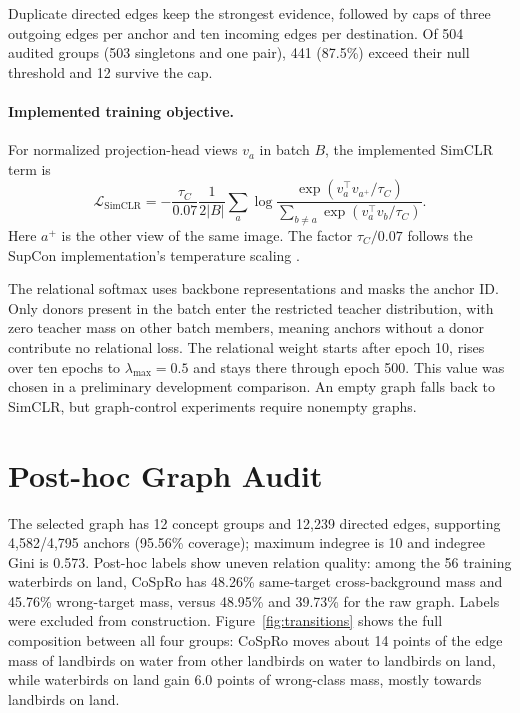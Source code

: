 \documentclass{article}
\begin{document}
Duplicate directed edges keep the strongest evidence, followed by caps of three outgoing edges per anchor and ten incoming edges per destination. Of 504 audited groups (503 singletons and one pair), 441 (87.5\%) exceed their null threshold and 12 survive the cap.

\paragraph{Implemented training objective.}
For normalized projection-head views $v_a$ in batch $B$, the implemented SimCLR term is
\begin{equation}
\mathcal{L}_{\mathrm{SimCLR}} = -\frac{\tau_C}{0.07} \frac{1}{2|B|}
\sum_a \log
\frac{
    \exp(v_a^\top v_{a^+}/\tau_C)
}{
    \sum_{b\neq a}\exp(v_a^\top v_b/\tau_C)
}.
\end{equation}
Here $a^+$ is the other view of the same image. The factor $\tau_C/0.07$ follows the SupCon implementation's temperature scaling \citep{khosla2020supcon}.

The relational softmax uses backbone representations and masks the anchor ID. Only donors present in the batch enter the restricted teacher distribution, with zero teacher mass on other batch members, meaning anchors without a donor contribute no relational loss. The relational weight starts after epoch 10, rises over ten epochs to $\lambda_{\max}=0.5$ and stays there through epoch 500. This value was chosen in a preliminary development comparison. An empty graph falls back to SimCLR, but graph-control experiments require nonempty graphs.

\section{Post-hoc Graph Audit}\label{app:graphaudit}
The selected graph has 12 concept groups and 12,239 directed edges, supporting 4,582/4,795 anchors (95.56\% coverage); maximum indegree is 10 and indegree Gini is 0.573. Post-hoc labels show uneven relation quality: among the 56 training waterbirds on land, CoSpRo has 48.26\% same-target cross-background mass and 45.76\% wrong-target mass, versus 48.95\% and 39.73\% for the raw graph. Labels were excluded from construction. Figure~\ref{fig:transitions} shows the full composition between all four groups: CoSpRo moves about 14 points of the edge mass of landbirds on water from other landbirds on water to landbirds on land, while waterbirds on land gain 6.0 points of wrong-class mass, mostly towards landbirds on land.
\end{document}
